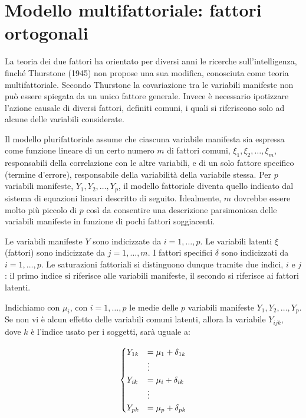 \documentclass[
  11pt,
]{krantz}
\theoremstyle{definition}
\theoremstyle{definition}
\theoremstyle{definition}
\theoremstyle{definition}
\theoremstyle{remark}
\begin{document}
\hypertarget{modello-multifattoriale-fattori-ortogonali}{%
\section{Modello multifattoriale: fattori ortogonali}\label{modello-multifattoriale-fattori-ortogonali}}

La teoria dei due fattori ha orientato per diversi anni le ricerche sull'intelligenza, finché Thurstone (1945) non propose una sua modifica, conosciuta come teoria multifattoriale. Secondo Thurstone la covariazione tra le variabili manifeste non può essere spiegata da un unico fattore generale. Invece è necessario ipotizzare l'azione causale di diversi fattori, definiti comuni, i quali si riferiscono solo ad alcune delle variabili considerate.

Il modello plurifattoriale assume che ciascuna variabile manifesta sia espressa come funzione lineare di un certo numero \(m\) di fattori comuni, \(\xi_1, \xi_2, \dots, \xi_m\), responsabili della correlazione con le altre variabili, e di un solo fattore specifico (termine d'errore), responsabile della variabilità della variabile stessa. Per \(p\) variabili manifeste, \(Y_1, Y_2, \dots, Y_p\), il modello fattoriale diventa quello indicato dal sistema di equazioni lineari descritto di seguito. Idealmente, \(m\) dovrebbe essere molto più piccolo di \(p\) così da consentire una descrizione parsimoniosa delle variabili manifeste in funzione di pochi fattori soggiacenti.

Le variabili manifeste \(Y\) sono indicizzate da \(i = 1, \dots, p.\) Le variabili latenti \(\xi\) (fattori) sono indicizzate da \(j = 1, \dots, m.\) I fattori specifici \(\delta\) sono indicizzati da \(i = 1, \dots, p.\) Le saturazioni fattoriali si distinguono dunque tramite due indici, \(i\) e \(j\): il primo indice si riferisce alle variabili manifeste, il secondo si riferisce ai fattori latenti.

Indichiamo con \(\mu_i\), con \(i=1, \dots, p\) le medie delle \(p\) variabili manifeste \(Y_1, Y_2, \dots, Y_p\). Se non vi è alcun effetto delle variabili comuni latenti, allora la variabile \(Y_{ijk}\), dove \(k\) è l'indice usato per i soggetti, sarà uguale a:

\begin{equation}
\begin{cases} 
  Y_{1k}    &= \mu_1 + \delta_{1k} \\
&\vdots\\
Y_{ik}   &= \mu_i + \delta_{ik}\\
&\vdots\\
Y_{pk}   &= \mu_p + \delta_{pk} \notag
\end{cases}
\end{equation}
\end{document}
